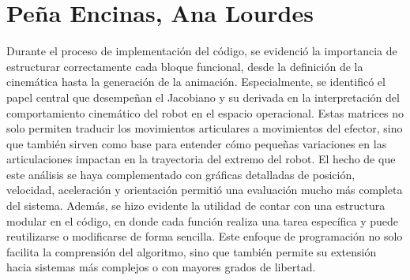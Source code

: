 \section{Peña Encinas, Ana Lourdes}
Durante el proceso de implementación del código, se evidenció la importancia de estructurar correctamente cada bloque funcional, desde la definición de la cinemática hasta la generación de la animación. Especialmente, se identificó el papel central que desempeñan el Jacobiano y su derivada en la interpretación del comportamiento cinemático del robot en el espacio operacional. Estas matrices no solo permiten traducir los movimientos articulares a movimientos del efector, sino que también sirven como base para entender cómo pequeñas variaciones en las articulaciones impactan en la trayectoria del extremo del robot. El hecho de que este análisis se haya complementado con gráficas detalladas de posición, velocidad, aceleración y orientación permitió una evaluación mucho más completa del sistema. Además, se hizo evidente la utilidad de contar con una estructura modular en el código, en donde cada función realiza una tarea específica y puede reutilizarse o modificarse de forma sencilla. Este enfoque de programación no solo facilita la comprensión del algoritmo, sino que también permite su extensión hacia sistemas más complejos o con mayores grados de libertad.